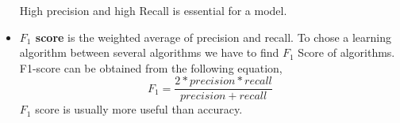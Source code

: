 \begin{itemize}
High precision and high Recall is essential for a model.%

\vspace{0.3cm}
\item{\textbf{$F_1$ score}} is the weighted average of precision and recall. To chose a learning algorithm between several algorithms we have to find $F_1$ Score of algorithms. F1-score can be obtained from the following equation,
 \begin{equation}
     F_1 = \frac{2*precision*recall}{precision+recall}
 \end{equation}
$F_1$ score is usually more useful than accuracy.


\end{itemize}